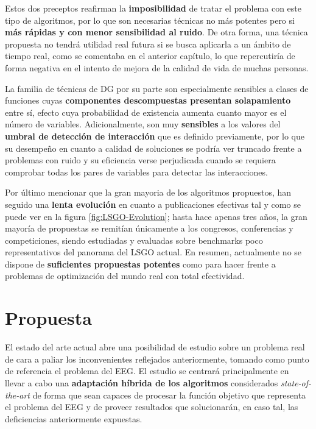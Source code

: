 Estos dos preceptos reafirman la \textbf{imposibilidad} de tratar el problema con este tipo de algoritmos, por lo que son necesarias técnicas no más potentes pero si \textbf{más rápidas y con menor sensibilidad al ruido}. De otra forma, una técnica propuesta no tendrá utilidad real futura si se busca aplicarla a un ámbito de tiempo real, como se comentaba en el anterior capítulo, lo que repercutiría de forma negativa en el intento de mejora de la calidad de vida de muchas personas.

La familia de técnicas de DG por su parte son especialmente sensibles a clases de funciones cuyas \textbf{componentes descompuestas presentan solapamiento} entre sí, efecto cuya probabilidad de existencia aumenta cuanto mayor es el número de variables. Adicionalmente, son muy \textbf{sensibles} a los valores del \textbf{umbral de detección de interacción} que es definido previamente, por lo que su desempeño en cuanto a calidad de soluciones se podría ver truncado frente a problemas con ruido y su eficiencia verse perjudicada cuando se requiera comprobar todas los pares de variables para detectar las interacciones.

Por último mencionar que la gran mayoria de los algoritmos propuestos, han seguido una \textbf{lenta evolución} en cuanto a publicaciones efectivas tal y como se puede ver en la figura \ref{fig:LSGO-Evolution}; hasta hace apenas tres años, la gran mayoría de propuestas se remitían únicamente a los congresos, conferencias y competiciones, siendo estudiadas y evaluadas sobre benchmarks poco representativos del panorama del LSGO actual. En resumen, actualmente no se dispone de \textbf{suficientes propuestas potentes} como para hacer frente a problemas de optimización del mundo real con total efectividad. 

\section{Propuesta}\label{Propuesta}

El estado del arte actual abre una posibilidad de estudio sobre un problema real de cara a paliar los inconvenientes reflejados anteriormente, tomando como punto de referencia el problema del EEG. El estudio se centrará principalmente en llevar a cabo una \textbf{adaptación híbrida de los algoritmos} considerados \textit{state-of-the-art} de forma que sean capaces de procesar la función objetivo que representa el problema del EEG y de proveer resultados que solucionarán, en caso tal, las deficiencias anteriormente expuestas.

